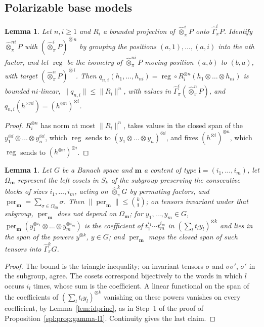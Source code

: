 \documentclass[11pt]{amsart}
\newtheorem{lemma}[theorem]{Lemma}
\theoremstyle{definition}
\theoremstyle{remark}
\numberwithin{equation}{section}
\newcommand{\norm}[1]{\lVert #1\rVert}
\theoremstyle{plain}
\theoremstyle{definition}
\theoremstyle{plain}
\newcommand{\hot}{\mathbin{\widehat\otimes}}
\newcommand{\hGamma}{\widehat\Gamma}
\begin{document}
\subsection{Polarizable base models}\label{fmo:ssec:polarizable}

\begin{lemma}\label{fmo:lem:regroup}
Let $n,i\ge1$ and $R_i$ a bounded projection of $\hot^i_\pi P$ onto $\hGamma^i_\pi P$. Identify $\hot^{ni}_\pi P$ with
$(\hot^i_\pi P)^{\hot n}$ by grouping the positions $(a,1),\dots,(a,i)$ into the $a$th factor, and let $\operatorname{reg}$ be
the isometry of $\hot^{ni}_\pi P$ moving position $(a,b)$ to $(b,a)$, with target $(\hot^n_\pi P)^{\hot i}$. Then
$q_{n,i}(h_1,\dots,h_{ni})=\operatorname{reg}\circ R_i^{\otimes n}(h_1\otimes\dots\otimes h_{ni})$ is bounded $ni$-linear,
$\norm{q_{n,i}}\le\norm{R_i}^n$, with values in $\hGamma^i_\pi(\hot^n_\pi P)$, and $q_{n,i}(h^{\times ni})=
(h^{\otimes n})^{\otimes i}$.
\end{lemma}

\begin{proof}
$R_i^{\otimes n}$ has norm at most $\norm{R_i}^n$, takes values in the closed span of the $y_1^{\otimes i}\otimes\dots\otimes
y_n^{\otimes i}$, which $\operatorname{reg}$ sends to $(y_1\otimes\dots\otimes y_n)^{\otimes i}$, and fixes
$(h^{\otimes i})^{\otimes n}$, which $\operatorname{reg}$ sends to $(h^{\otimes n})^{\otimes i}$.
\end{proof}

\begin{lemma}\label{fmo:lem:per}
Let $G$ be a Banach space and $\mathbf m$ a content of type $\mathbf i=(i_1,\dots,i_m)$, let $\Omega_{\mathbf m}$ represent
the left cosets in $S_k$ of the subgroup preserving the consecutive blocks of sizes $i_1,\dots,i_m$, acting on
$\hot^k_\pi G$ by permuting factors, and $\operatorname{per}_{\mathbf m}=\sum_{\sigma\in\Omega_{\mathbf m}}\sigma$. Then
$\norm{\operatorname{per}_{\mathbf m}}\le\binom k{\mathbf i}$; on tensors invariant under that subgroup,
$\operatorname{per}_{\mathbf m}$ does not depend on $\Omega_{\mathbf m}$; for $y_1,\dots,y_m\in G$,
$\operatorname{per}_{\mathbf m}(y_1^{\otimes i_1}\otimes\dots\otimes y_m^{\otimes i_m})$ is the coefficient of
$t_1^{i_1}\cdots t_m^{i_m}$ in $(\sum_lt_ly_l)^{\otimes k}$ and lies in the span of the powers $y^{\otimes k}$, $y\in G$;
and $\operatorname{per}_{\mathbf m}$ maps the closed span of such tensors into $\hGamma^k_\pi G$.
\end{lemma}

\begin{proof}
The bound is the triangle inequality; on invariant tensors $\sigma$ and $\sigma\sigma'$, $\sigma'$ in the subgroup, agree.
The cosets correspond bijectively to the words in which $l$ occurs $i_l$ times, whose sum is the coefficient. A linear
functional on the span of the coefficients of $(\sum_lt_ly_l)^{\otimes k}$ vanishing on these powers vanishes on every
coefficient, by Lemma~\ref{lem:idprinc}, as in Step~1 of the proof of Proposition~\ref{spl:prop:gamma-l1}. Continuity gives
the last claim.
\end{proof}
\end{document}

